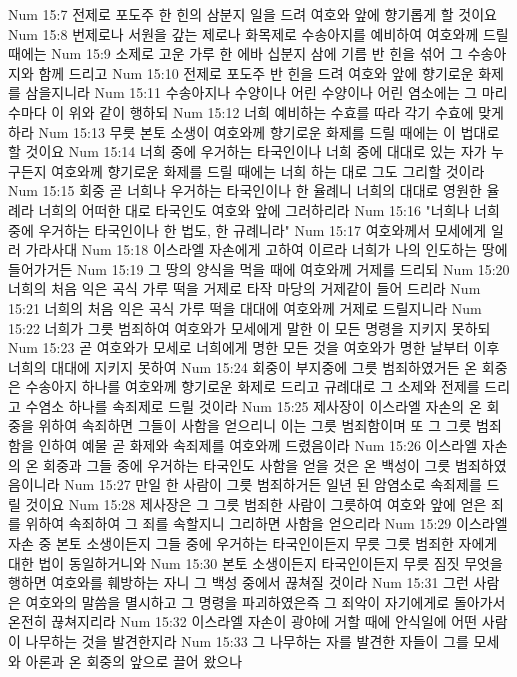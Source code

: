 Num 15:7  전제로 포도주 한 힌의 삼분지 일을 드려 여호와 앞에 향기롭게 할 것이요
Num 15:8  번제로나 서원을 갚는 제로나 화목제로 수송아지를 예비하여 여호와께 드릴 때에는
Num 15:9  소제로 고운 가루 한 에바 십분지 삼에 기름 반 힌을 섞어 그 수송아지와 함께 드리고
Num 15:10  전제로 포도주 반 힌을 드려 여호와 앞에 향기로운 화제를 삼을지니라
Num 15:11  수송아지나 수양이나 어린 수양이나 어린 염소에는 그 마리 수마다 이 위와 같이 행하되
Num 15:12  너희 예비하는 수효를 따라 각기 수효에 맞게 하라
Num 15:13  무릇 본토 소생이 여호와께 향기로운 화제를 드릴 때에는 이 법대로 할 것이요
Num 15:14  너희 중에 우거하는 타국인이나 너희 중에 대대로 있는 자가 누구든지 여호와께 향기로운 화제를 드릴 때에는 너희 하는 대로 그도 그리할 것이라
Num 15:15  회중 곧 너희나 우거하는 타국인이나 한 율례니 너희의 대대로 영원한 율례라 너희의 어떠한 대로 타국인도 여호와 앞에 그러하리라
Num 15:16  "너희나 너희 중에 우거하는 타국인이나 한 법도, 한 규례니라"
Num 15:17  여호와께서 모세에게 일러 가라사대
Num 15:18  이스라엘 자손에게 고하여 이르라 너희가 나의 인도하는 땅에 들어가거든
Num 15:19  그 땅의 양식을 먹을 때에 여호와께 거제를 드리되
Num 15:20  너희의 처음 익은 곡식 가루 떡을 거제로 타작 마당의 거제같이 들어 드리라
Num 15:21  너희의 처음 익은 곡식 가루 떡을 대대에 여호와께 거제로 드릴지니라
Num 15:22  너희가 그릇 범죄하여 여호와가 모세에게 말한 이 모든 명령을 지키지 못하되
Num 15:23  곧 여호와가 모세로 너희에게 명한 모든 것을 여호와가 명한 날부터 이후 너희의 대대에 지키지 못하여
Num 15:24  회중이 부지중에 그릇 범죄하였거든 온 회중은 수송아지 하나를 여호와께 향기로운 화제로 드리고 규례대로 그 소제와 전제를 드리고 수염소 하나를 속죄제로 드릴 것이라
Num 15:25  제사장이 이스라엘 자손의 온 회중을 위하여 속죄하면 그들이 사함을 얻으리니 이는 그릇 범죄함이며 또 그 그릇 범죄함을 인하여 예물 곧 화제와 속죄제를 여호와께 드렸음이라
Num 15:26  이스라엘 자손의 온 회중과 그들 중에 우거하는 타국인도 사함을 얻을 것은 온 백성이 그릇 범죄하였음이니라
Num 15:27  만일 한 사람이 그릇 범죄하거든 일년 된 암염소로 속죄제를 드릴 것이요
Num 15:28  제사장은 그 그릇 범죄한 사람이 그릇하여 여호와 앞에 얻은 죄를 위하여 속죄하여 그 죄를 속할지니 그리하면 사함을 얻으리라
Num 15:29  이스라엘 자손 중 본토 소생이든지 그들 중에 우거하는 타국인이든지 무릇 그릇 범죄한 자에게 대한 법이 동일하거니와
Num 15:30  본토 소생이든지 타국인이든지 무릇 짐짓 무엇을 행하면 여호와를 훼방하는 자니 그 백성 중에서 끊쳐질 것이라
Num 15:31  그런 사람은 여호와의 말씀을 멸시하고 그 명령을 파괴하였은즉 그 죄악이 자기에게로 돌아가서 온전히 끊쳐지리라
Num 15:32  이스라엘 자손이 광야에 거할 때에 안식일에 어떤 사람이 나무하는 것을 발견한지라
Num 15:33  그 나무하는 자를 발견한 자들이 그를 모세와 아론과 온 회중의 앞으로 끌어 왔으나

